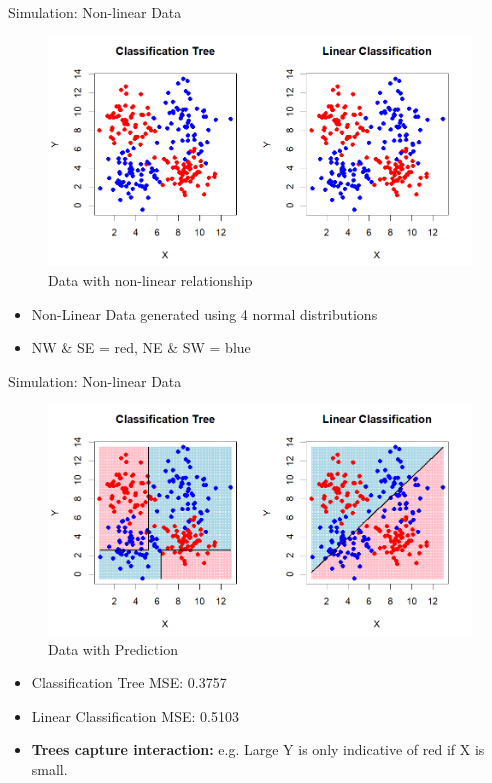 \documentclass[10pt]{beamer}
\begin{document}
\begin{frame}{Simulation: Non-linear Data}
    
        \begin{figure}
            \centering
            \includegraphics[scale=0.6]{NLD.png}
            \caption{Data with non-linear relationship}
            \label{fig:sub5}  %
        \end{figure}
        \vspace{-0.5cm}
        \begin{itemize}
        \item Non-Linear Data generated using 4 normal distributions
        \item NW \& SE = red, NE \& SW = blue
    \end{itemize}
\end{frame}


\begin{frame}{Simulation: Non-linear Data}
    \begin{figure}
        \centering
        \includegraphics[scale=0.6]{NLD Pred.png}
        \caption{Data with Prediction}
        \label{fig:sub6}  %
    \end{figure}
    \vspace{-0.5cm}
    \begin{itemize}
        \item Classification Tree MSE: 0.3757
        \item Linear Classification MSE: 0.5103
        \item \textbf{Trees capture interaction:} e.g. Large Y is only indicative of red if X is small.
    \end{itemize}
\end{frame}
\end{document}
